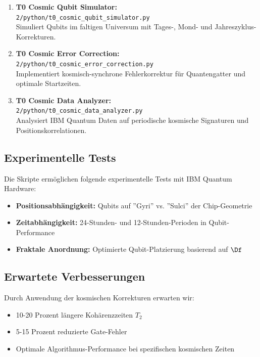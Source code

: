 \begin{enumerate}
	\item \textbf{T0 Cosmic Qubit Simulator:} \\
	\texttt{2/python/t0\_cosmic\_qubit\_simulator.py} \\
	Simuliert Qubits im faltigen Universum mit Tages-, Mond- und Jahreszyklus-Korrekturen.
	
	\item \textbf{T0 Cosmic Error Correction:} \\
	\texttt{2/python/t0\_cosmic\_error\_correction.py} \\
	Implementiert kosmisch-synchrone Fehlerkorrektur für Quantengatter und optimale Startzeiten.
	
	\item \textbf{T0 Cosmic Data Analyzer:} \\
	\texttt{2/python/t0\_cosmic\_data\_analyzer.py} \\
	Analysiert IBM Quantum Daten auf periodische kosmische Signaturen und Positionskorrelationen.
\end{enumerate}

\subsection{Experimentelle Tests}

Die Skripte ermöglichen folgende experimentelle Tests mit IBM Quantum Hardware:

\begin{itemize}
	\item \textbf{Positionsabhängigkeit:} Qubits auf ''Gyri'' vs. ''Sulci'' der Chip-Geometrie
	\item \textbf{Zeitabhängigkeit:} 24-Stunden- und 12-Stunden-Perioden in Qubit-Performance
	\item \textbf{Fraktale Anordnung:} Optimierte Qubit-Platzierung basierend auf $\Df$
\end{itemize}

\subsection{Erwartete Verbesserungen}

Durch Anwendung der kosmischen Korrekturen erwarten wir:

\begin{itemize}
	\item 10-20 Prozent längere Kohärenzzeiten $T_2$
	\item 5-15 Prozent reduzierte Gate-Fehler
	\item Optimale Algorithmus-Performance bei spezifischen kosmischen Zeiten
\end{itemize}

